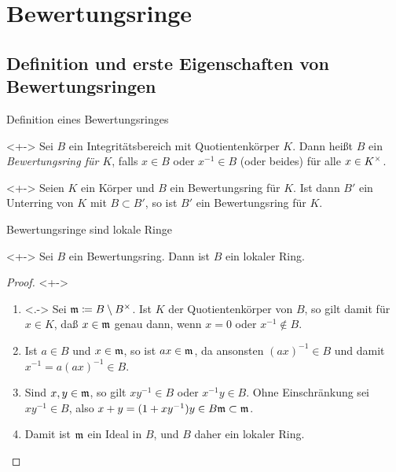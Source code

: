 \section{Bewertungsringe}

\subsection{Definition und erste Eigenschaften von Bewertungsringen}

\begin{frame}{Definition eines Bewertungsringes}
	\begin{definition}<+->
		Sei \(B\) ein Integritätsbereich mit Quotientenkörper \(K\). Dann heißt
		\(B\) ein \emph{Bewertungsring für \(K\)}, falls 
		\(x \in B\) oder \(x^{-1} \in B\) (oder beides) für alle \(x \in K^\times\).
	\end{definition}
	\begin{example}<+->
		Seien \(K\) ein Körper und \(B\) ein Bewertungsring für \(K\). Ist
		dann \(B'\) ein Unterring von \(K\) mit \(B \subset B'\), so ist
		\(B'\) ein Bewertungsring für \(K\).
	\end{example}
\end{frame}

\begin{frame}{Bewertungsringe sind lokale Ringe}
	\begin{proposition}<+->
		Sei \(B\) ein Bewertungsring. Dann ist \(B\) ein lokaler Ring.
	\end{proposition}
	\begin{proof}<+->
		\begin{enumerate}[<+->]
		\item<.->
			Sei \(\mathfrak{m} \coloneqq B \setminus B^\times\). Ist \(K\) der
			Quotientenkörper von \(B\), so gilt damit für \(x \in K\), daß
			\(x \in \mathfrak{m}\) genau dann, wenn \(x = 0\) oder \(x^{-1} \notin B\).
		\item
			Ist \(a \in B\) und \(x \in \mathfrak{m}\), so ist \(ax \in \mathfrak{m}\),
			da ansonsten \((ax)^{-1} \in B\) und damit \(x^{-1} = a (ax)^{-1}
			\in B\).
		\item
			Sind \(x, y \in \mathfrak{m}\), so gilt \(xy^{-1} \in B\) oder
			\(x^{-1} y \in B\). Ohne Einschränkung sei \(xy^{-1} \in B\),
			also \(x + y = (1 + xy^{-1}) y \in B \mathfrak{m} \subset \mathfrak{m}\).
		\item
			Damit ist \(\mathfrak{m}\) ein Ideal in \(B\), und \(B\) daher ein
			lokaler Ring.
			\qedhere
		\end{enumerate}
	\end{proof}
\end{frame}

